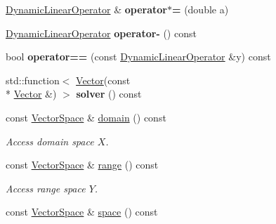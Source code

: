 \begin{DoxyCompactItemize}
\item 
\hypertarget{classSpacy_1_1DynamicLinearOperator_ae8fc6f0856bc0218b53a7371cf2928f4}{\hyperlink{classSpacy_1_1DynamicLinearOperator}{Dynamic\-Linear\-Operator} \& {\bfseries operator$\ast$=} (double a)}\label{classSpacy_1_1DynamicLinearOperator_ae8fc6f0856bc0218b53a7371cf2928f4}

\item 
\hypertarget{classSpacy_1_1DynamicLinearOperator_afd842124db19f3bb9716ca4bb12a4867}{\hyperlink{classSpacy_1_1DynamicLinearOperator}{Dynamic\-Linear\-Operator} {\bfseries operator-\/} () const }\label{classSpacy_1_1DynamicLinearOperator_afd842124db19f3bb9716ca4bb12a4867}

\item 
\hypertarget{classSpacy_1_1DynamicLinearOperator_a8f252aa5f13f636533d6f4337c4116d0}{bool {\bfseries operator==} (const \hyperlink{classSpacy_1_1DynamicLinearOperator}{Dynamic\-Linear\-Operator} \&y) const }\label{classSpacy_1_1DynamicLinearOperator_a8f252aa5f13f636533d6f4337c4116d0}

\item 
\hypertarget{classSpacy_1_1DynamicLinearOperator_a4b13c6d8ff566bd1f332aa10ca9c8064}{std\-::function$<$ \hyperlink{classSpacy_1_1Vector}{Vector}(const \\*
\hyperlink{classSpacy_1_1Vector}{Vector} \&) $>$ {\bfseries solver} () const }\label{classSpacy_1_1DynamicLinearOperator_a4b13c6d8ff566bd1f332aa10ca9c8064}

\item 
\hypertarget{classSpacy_1_1DynamicLinearOperator_aa5882565e1a88f20a16f7e7a27df3015}{const \hyperlink{classSpacy_1_1VectorSpace}{Vector\-Space} \& \hyperlink{classSpacy_1_1DynamicLinearOperator_aa5882565e1a88f20a16f7e7a27df3015}{domain} () const }\label{classSpacy_1_1DynamicLinearOperator_aa5882565e1a88f20a16f7e7a27df3015}

\begin{DoxyCompactList}\small\item\em Access domain space $X$. \end{DoxyCompactList}\item 
\hypertarget{classSpacy_1_1DynamicLinearOperator_a08e5f8bd41f1112ae349e50dd773b9ea}{const \hyperlink{classSpacy_1_1VectorSpace}{Vector\-Space} \& \hyperlink{classSpacy_1_1DynamicLinearOperator_a08e5f8bd41f1112ae349e50dd773b9ea}{range} () const }\label{classSpacy_1_1DynamicLinearOperator_a08e5f8bd41f1112ae349e50dd773b9ea}

\begin{DoxyCompactList}\small\item\em Access range space $Y$. \end{DoxyCompactList}\item 
\hypertarget{classSpacy_1_1DynamicLinearOperator_afde64039ceab0ad8752bce3ac2187a41}{const \hyperlink{classSpacy_1_1VectorSpace}{Vector\-Space} \& \hyperlink{classSpacy_1_1DynamicLinearOperator_afde64039ceab0ad8752bce3ac2187a41}{space} () const }\label{classSpacy_1_1DynamicLinearOperator_afde64039ceab0ad8752bce3ac2187a41}


\end{DoxyCompactItemize}
